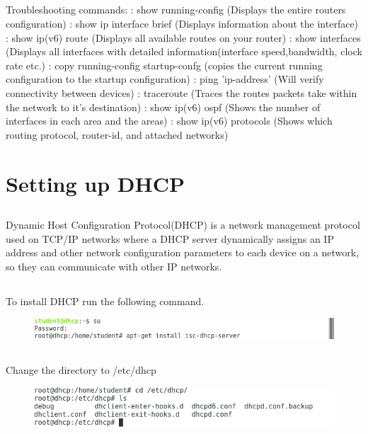 \documentclass{article}
\begin{document}
\subsection{}
Troubleshooting commands:
: show running-config (Displays the entire routers configuration)
: show ip interface brief (Displays information about the interface)
: show ip(v6) route (Displays all available routes on your router)
: show interfaces (Displays all interfaces with detailed information(interface speed,bandwidth, clock rate etc.)
: copy running-config startup-confg (copies the current running configuration to the startup configuration)
: ping 'ip-address' (Will verify connectivity between devices)
: traceroute (Traces the routes packets take within the network to it's destination)
: show ip(v6) ospf (Shows the number of interfaces in each area and the areas)
: show ip(v6) protocols (Shows which routing protocol, router-id, and attached networks)
\newpage
\section{Setting up DHCP}
\subsection{}
Dynamic Host Configuration Protocol(DHCP) is a network management protocol used on TCP/IP networks where a DHCP server dynamically assigns an IP address and other network configuration parameters to each device on a network, so they can communicate with other IP networks.
\subsection{}
To install DHCP run the following command.
\begin{figure}[h]
	\centering
	\includegraphics[width=1\linewidth]{dhcp-install}
\end{figure}
\subsection{}
Change the directory to /etc/dhcp
\begin{figure}[h]
	\centering
	\includegraphics[width=1\linewidth]{dhcp-config1}
\end{figure}
\newpage
\end{document}
